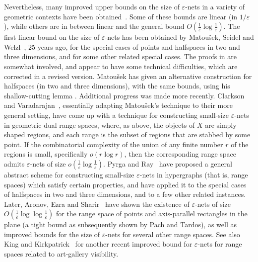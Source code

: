 \documentclass[12pt]{article}
\newcommand{\eps}{{\varepsilon}}
\providecommand{\Matousek}{Matou{\v s}ek\xspace}
\begin{document}
Nevertheless, many improved upper bounds on the size of $\eps$-nets in
a variety of geometric contexts have been
obtained~\cite{aes-ssena-10, cv-iaags-07, kk-iagsg-11, pr-nepen-08}. 
Some of these bounds are linear (in $1/\eps$), while
others are in between linear and the general bound
$O\left(\frac{1}{\eps}\log\frac{1}{\eps}\right)$.  The first linear
bound on the size of $\eps$-nets has been obtained by \Matousek,
Seidel and Welzl~\cite{msw-hnlls-90}, 25 years ago, for the special
cases of points and halfspaces in two and three dimensions, and for
some other related special cases. The proofs in \cite{msw-hnlls-90}
are somewhat involved, and appear to have some technical difficulties,
which are corrected in a revised version.  \Matousek has given an
alternative construction for halfspaces (in two and three dimensions),
with the same bounds, using his shallow-cutting lemma \cite{m-rph-92}.
Additional progress was made more recently.  Clarkson and
Varadarajan~\cite{cv-iaags-07}, essentially adapting \Matousek's
technique to their more general setting, have come up with a technique
for constructing small-size $\eps$-nets in geometric dual range spaces,
where, as above, the objects of $X$ are simply shaped regions, and each 
range is the subset of regions that are stabbed by some point.
If the combinatorial complexity of the union of any finite number $r$ 
of the regions is small, specifically $o(r\log r)$, then the corresponding
range space admits $\eps$-nets of size $o\left(\frac{1}{\eps}\log\frac{1}{\eps}\right)$.
Pyrga and Ray~\cite{pr-nepen-08} have proposed a general abstract
scheme for constructing small-size $\eps$-nets in hypergraphs (that
is, range spaces) which satisfy certain properties, and have applied
it to the special cases of halfspaces in two and three dimensions, and
to a few other related instances. Later, Aronov, Ezra and
Sharir~\cite{aes-ssena-10} have shown the existence of $\eps$-nets of
size $O\left(\frac{1}{\eps}\log\log\frac{1}{\eps}\right)$ for the
range space of points and axis-parallel rectangles in the plane 
(a tight bound as subsequently shown by Pach and Tardos), as well as 
improved bounds for the size of $\eps$-nets for several other range spaces. 
See also King and Kirkpatrick~\cite{kk-iagsg-11} for another recent improved 
bound for $\eps$-nets for range spaces related to art-gallery visibility.
\end{document}
